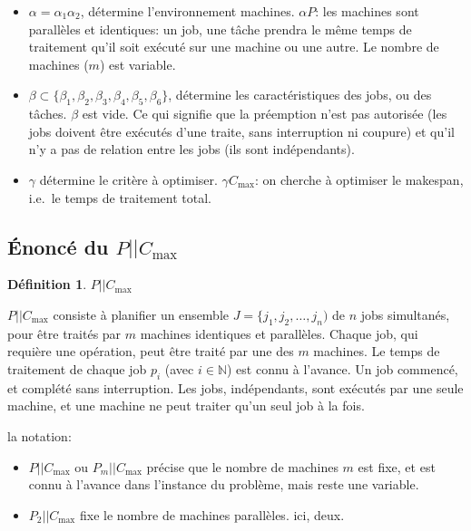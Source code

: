 \documentclass[a4paper,12pt]{report}
\theoremstyle{plain}				%
\theoremstyle{definition}				%
\newtheorem{definition}{Définition} %
\newcommand\problemGrahamPm{$P_m||C_{\max}$\xspace}
\newcommand\problemGrahamPII{$P_2||C_{\max}$\xspace}	%
\newcommand\problemGrahamP{$P||C_{\max}$\xspace}
\begin{document}
\begin{itemize}

\item $\alpha = \alpha_1 \alpha_2$, détermine l'environnement
  machines.
  $\alpha P$: les machines sont parallèles et identiques: un job,
  une tâche prendra le même temps de traitement qu'il soit exécuté sur
  une machine ou une autre.
  Le nombre de machines ($m$) est variable.

\item $\beta \subset \{ \beta_1, \beta_2, \beta_3,
  \beta_4, \beta_5, \beta_6\}$, détermine les caractéristiques
  des jobs, ou des tâches.
  $\beta$ est vide.
  Ce qui signifie que la préemption n'est pas autorisée (les jobs
  doivent être exécutés d'une traite, sans interruption ni coupure)
  et qu'il n'y a pas de relation entre les jobs (ils sont
  indépendants).

\item $\gamma $ détermine le critère à optimiser.
$\gamma C_{\max}$: on cherche à optimiser le makespan,
i.e.\ le temps de traitement total.

\end{itemize}

\bigskip

\subsection{Énoncé du \problemGrahamP}



\begin{definition}{\problemGrahamP}

  \problemGrahamP consiste à planifier un ensemble $J = \{j_1,j_2,\ldots,j_n)$
  de $n$ jobs simultanés, pour être traités par $m$ machines identiques et
  parallèles.
  Chaque job, qui requière une opération, peut être traité par une des
  $m$ machines.
  Le temps de traitement de chaque job $p_i$ (avec $i \in \mathbb{N}$) est connu à l'avance.
  Un job commencé, et complété sans interruption.
  Les jobs, indépendants, sont exécutés par une seule machine, et une
  machine ne peut traiter qu'un seul job à la fois.

la notation:
\begin{itemize}
\item \problemGrahamP ou \problemGrahamPm précise que le nombre de
  machines $m$ est fixe, et est connu à l'avance dans l'instance du
  problème, mais reste une variable.
\item \problemGrahamPII fixe le nombre de machines parallèles.
  ici, deux.
\end{itemize}

\end{definition}
\end{document}
